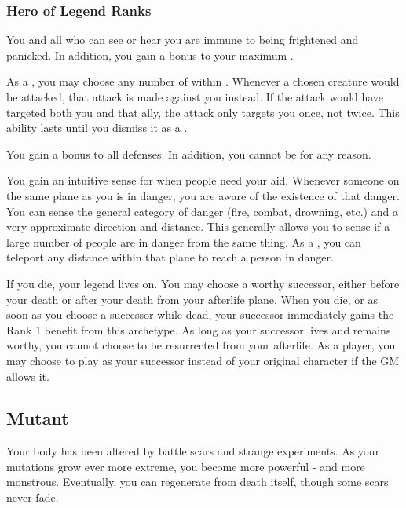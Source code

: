     \subsubsection{Hero of Legend Ranks}
       You and all  who can see or hear you are immune to being frightened and panicked.
      In addition, you gain a  bonus to your maximum .

       As a , you may choose any number of  within \longrange.
      Whenever a chosen creature would be attacked, that attack is made against you instead.
      If the attack would have targeted both you and that ally, the attack only targets you once, not twice.
      This ability lasts until you dismiss it as a .

       You gain a  bonus to all defenses.
      In addition, you cannot be \vulnerable for any reason.

       You gain an intuitive sense for when people need your aid.
      Whenever someone on the same plane as you is in danger, you are aware of the existence of that danger.
      You can sense the general category of danger (fire, combat, drowning, etc.) and a very approximate direction and distance.
      This generally allows you to sense if a large number of people are in danger from the same thing.
      As a , you can teleport any distance within that plane to reach a person in danger.

       If you die, your legend lives on.
      You may choose a worthy successor, either before your death or after your death from your afterlife plane.
      When you die, or as soon as you choose a successor while dead, your successor immediately gains the Rank 1 benefit from this archetype.
      As long as your successor lives and remains worthy, you cannot choose to be resurrected from your afterlife.
      As a player, you may choose to play as your successor instead of your original character if the GM allows it.

  \subsection{Mutant}
    Your body has been altered by battle scars and strange experiments.
    As your mutations grow ever more extreme, you become more powerful - and more monstrous.
    Eventually, you can regenerate from death itself, though some scars never fade.

